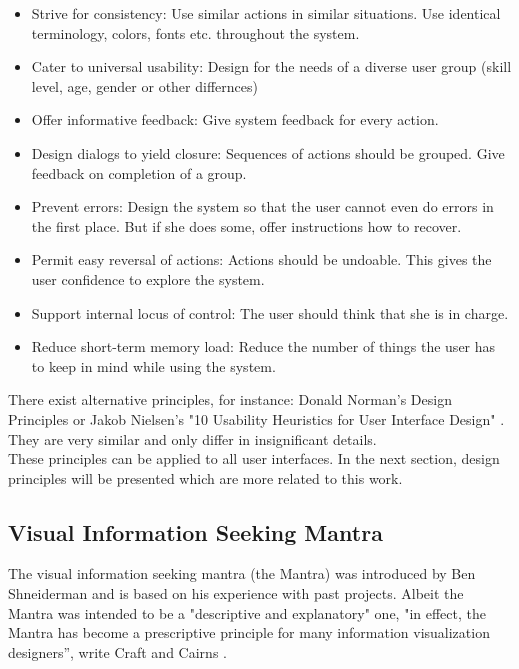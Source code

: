 \documentclass[11pt]{report}
\begin{document}
\begin{itemize}
	\item Strive for consistency: Use similar actions in similar situations. Use identical terminology, colors, fonts etc. throughout the system.	
	\item Cater to universal usability: Design for the needs of a diverse user group (skill level, age, gender or other differnces)
	\item Offer informative feedback: Give system feedback for every action.
	\item Design dialogs to yield closure: Sequences of actions should be grouped. Give feedback on completion of a group.
	\item Prevent errors: Design the system so that the user cannot even do errors in the first place. But if she does some, offer instructions how to recover.
	\item Permit easy reversal of actions: Actions should be undoable. This gives the user confidence to explore the system.
	\item Support internal locus of control: The user should think that she is in charge.
	\item Reduce short-term memory load: Reduce the number of things the user has to keep in mind while using the system.
\end{itemize}

There exist alternative principles, for instance: Donald Norman's Design Principles \cite{Norman2013} or Jakob Nielsen's "10 Usability Heuristics for User Interface Design" \cite{Nielsen1995}. They are very similar and only differ in insignificant details.\\

These principles can be applied to all user interfaces. In the next section, design principles will be presented which are more related to this work.

\subsection{Visual Information Seeking Mantra}

The visual information seeking mantra (the Mantra) was introduced by Ben Shneiderman \cite{Shneiderman1996} and is based on his experience with past projects. Albeit the Mantra was intended to be a "descriptive and explanatory" \cite{Card1999} one, "in effect, the Mantra has become a prescriptive principle for many information visualization designers”, write Craft and Cairns \cite{Craft2005}. \\
\end{document}
